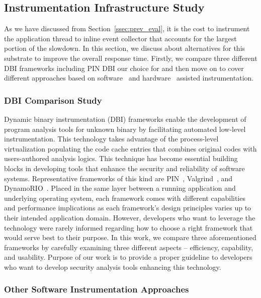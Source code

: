 \subsection{Instrumentation Infrastructure Study}
\label{ssec:inst_infra}

As we have discussed from Section~\ref{ssec:prev_eval}, it is the cost to
instrument the application thread to inline event collector that accounts for
the largest portion of the slowdown. In this section, we discuss about
alternatives for this substrate to improve the overall response time. Firstly,
we compare three different DBI frameworks including PIN DBI our choice for
\sreplica and then move on to cover different approaches based on
software~\cite{brewriting:usenix2003, DTrace} and
hardware~\cite{raksha:isca2007, lba:isca2008} assisted instrumentation. 

\subsubsection{DBI Comparison Study} 
\label{ssec:dbi_study}

Dynamic binary instrumentation (DBI) frameworks enable the development of
program analysis tools for unknown binary by facilitating automated low-level
instrumentation. This technology takes advantage of the process-level
virtualization populating the code cache entries that combines original codes
with users-authored analysis logics. This technique has become essential
building blocks in developing tools that enhance the security and reliability
of software systems.  Representative frameworks of this kind are
PIN~\cite{pin:pldi2005}, Valgrind~\cite{valgrind}, and
DynamoRIO~\cite{dynamorio}.
%
Placed in the same layer between a running application and underlying operating
system, each framework comes with different capabilities and performance
implications as each framework’s design principles varies up to their intended
application domain. However, developers who want to leverage the technology
were rarely informed regarding how to choose a right framework that would serve
best to their purpose.
%
In this work, we compare three aforementioned frameworks by carefully examining
three different aspects – efficiency, capability, and usability. Purpose of our
work is to provide a proper guideline to developers who want to develop
security analysis tools enhancing this technology.

\subsubsection{Other Software Instrumentation Approaches}
\label{ssec:sw_inst}


